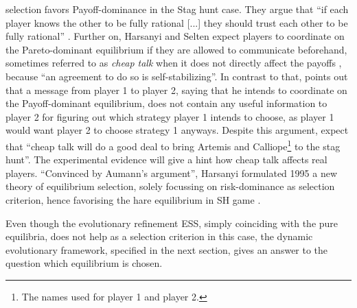 \documentclass[11pt]{article}
\begin{document}
selection favors Payoff-dominance in the Stag hunt case. They argue that
``if each player knows the other to be fully rational [...] they should trust
each other to be fully rational'' \parencite[89]{harsanyi_general_1988}.
Further on, Harsanyi and Selten expect players to coordinate on the
Pareto-dominant equilibrium if they are allowed to communicate beforehand,
sometimes referred to as \textit{cheap talk} when it does not directly affect
the payoffs \parencite[104]{farrell_cheap_1996}, 
because ``an agreement to do so is self-stabilizing''. 
In contrast to that,
\textcite{aumann_nash_1990} points out that a message from player 1 to 
player 2, saying that he intends to coordinate on the Payoff-dominant 
equilibrium, does not contain any useful information to player 2 for 
figuring out which strategy player 1 intends to choose, as player 1 would
want player 2 to choose strategy 1 anyways. Despite this argument, 
\textcite[114]{farrell_cheap_1996} expect that 
``cheap talk will do a good deal to
bring Artemis and Calliope\footnote{The names
\textcite{farrell_cheap_1996} used for player 1 and player 2.} 
to the stag hunt''. The experimental evidence will give a hint how cheap
talk affects real players. 
``Convinced by Aumann's argument'', Harsanyi formulated 1995 a new theory
of equilibrium selection, solely focussing on risk-dominance as selection
criterion, hence favorising the hare equilibrium in SH game 
\parencite[92,94,96]{harsanyi_new_1995}. 

Even though the evolutionary refinement ESS, simply coinciding with
the pure equilibria, does not help as a selection
criterion in this case, the dynamic evolutionary framework, specified in the
next section, gives an answer to the question which equilibrium is chosen. 
\end{document}
